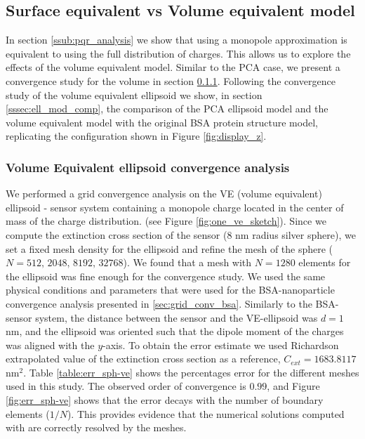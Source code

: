 \subsection{Surface equivalent vs Volume equivalent model} \label{ssec:surf_vol_ell}

In section \ref{ssub:pqr_analysis} we show that using a monopole approximation is equivalent to using the full distribution of charges. This 
allows us to explore the effects of the volume equivalent model. Similar to the PCA case, we present a convergence study for the volume  in section \ref{sssec:ve_conv}. 
Following the convergence study of the volume equivalent ellipsoid we show, in section \ref{sssec:ell_mod_comp}, the comparison of the PCA ellipsoid model and the volume equivalent 
model with the original BSA protein structure model, replicating the configuration shown in Figure \ref{fig:display_z}. 

\subsubsection{Volume Equivalent ellipsoid convergence analysis}\label{sssec:ve_conv}

We performed a grid convergence analysis on the VE (volume equivalent) ellipsoid - sensor system containing a monopole charge located 
in the center of mass of the charge distribution. (see Figure \ref{fig:one_ve_sketch}). Since we compute the extinction cross section of the sensor 
(8 nm radius silver sphere), we set a fixed mesh density for the ellipsoid and refine 
the mesh of the sphere ($N=512,\,  2048,\, 8192,\, 32768$). We found that a mesh with $N=1280$ elements for the ellipsoid was fine enough for the convergence study.
We used the same physical conditions and parameters that were used for the BSA-nanoparticle convergence analysis presented in
\ref{sec:grid_conv_bsa}. Similarly to the BSA-sensor system, the distance between the sensor and the VE-ellipsoid 
was $d=1$ nm, and the ellipsoid was oriented such that the dipole moment of the charges was aligned with the $y$-axis. To obtain the error 
estimate we used Richardson extrapolated value of the extinction cross section as a reference, $C_{ext} = 1683.8117$ nm$^2$. Table \ref{table:err_sph-ve} shows 
the percentages error for the different meshes used in this study. The observed order of convergence is $0.99$, and Figure \ref{fig:err_sph-ve} shows that the error decays 
with the number of boundary elements ($1/N$). This provides evidence that the numerical solutions computed with \pygbe are correctly resolved by the meshes.  


